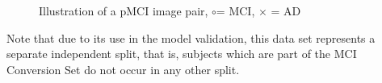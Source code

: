 \begin{figure}[h]
	\centering
	
	\caption{Illustration of a pMCI image pair, \Large$\circ$\normalsize\;= MCI, $\times$ = AD}
	\label{fig:pmci}
\end{figure}

Note that due to its use in the model validation, this data set represents a separate independent split, that is, subjects which are part of the MCI Conversion Set do not occur in any other split.

